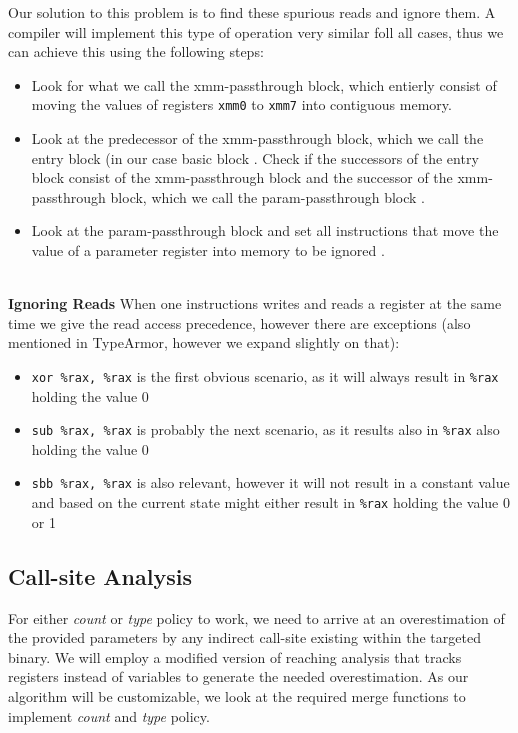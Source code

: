 Our solution to this problem is to find these spurious reads and ignore them. A compiler will implement this type of operation very 
similar foll all cases, thus we can achieve this using the following steps:
\begin{itemize}
\item Look for what we call the xmm-passthrough block, which entierly consist of moving the values of registers \texttt{xmm0} to 
\texttt{xmm7} into contiguous memory.%
\item Look at the predecessor of the xmm-passthrough block, which we call the entry block (in our case basic block %
. Check if the successors of the entry block consist of the xmm-passthrough block and the successor of the 
xmm-passthrough block, which we call the param-passthrough block
.
\item Look at the param-passthrough block and set all instructions that move the value of a parameter register into memory to be
ignored %
.
\end{itemize}

~\\
\textbf{Ignoring Reads} When one instructions writes and reads a register at the same time we give the read access precedence, however there are exceptions (also mentioned in TypeArmor, however we expand slightly on that):
\begin{itemize}
\item \texttt{xor \%rax, \%rax} is the first obvious scenario, as it will always result in \texttt{\%rax} holding the value 0
\item \texttt{sub \%rax, \%rax} is probably the next scenario, as it results also in \texttt{\%rax} also holding the value 0
\item \texttt{sbb \%rax, \%rax} is also relevant, however it will not result in a constant value and based on the current state might either result in \texttt{\%rax} holding the value 0 or 1
\end{itemize}

\subsection{Call-site Analysis}
\label{section:callsiteanalysis}
For either \emph{count} or \emph{type} policy to work, we need to arrive at an overestimation of the provided parameters by any indirect 
call-site existing within the targeted binary. We will employ a modified version of reaching analysis that tracks registers instead of 
variables to generate the needed overestimation. As our algorithm will be customizable, we look at the required merge functions to 
implement \emph{count} and \emph{type} policy. 

